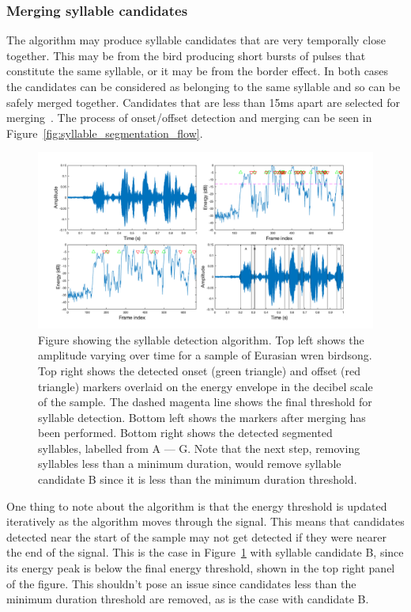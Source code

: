 \subsubsection{Merging syllable candidates}

The algorithm may produce syllable candidates that are very temporally close
together. This may be from the bird producing short bursts of pulses that
constitute the same syllable, or it may be from the border effect. In both cases
the candidates can be considered as belonging to the same syllable and so can be
safely merged together. Candidates that are less than 15ms apart are selected
for merging~\cite{fagerlund2004automatic}. The process of onset/offset detection
and merging can be seen in Figure~\ref{fig:syllable_segmentation_flow}.

\begin{figure}[ht]
  \centering
  \includegraphics[width=\textwidth]{figures/syllable_segmentation_2.png}
  \caption{Figure showing the syllable detection algorithm. Top left shows the
    amplitude varying over time for a sample of Eurasian wren birdsong. Top
    right shows the detected onset (green triangle) and offset (red triangle)
    markers overlaid on the energy envelope in the decibel scale of the sample.
    The dashed magenta line shows the final threshold for syllable detection.
    Bottom left shows the markers after merging has been performed. Bottom right
    shows the detected segmented syllables, labelled from A --- G. Note that the
    next step, removing syllables less than a minimum duration, would remove
    syllable candidate B since it is less than the minimum duration
threshold.}\label{fig:syllable_segmentation}
\end{figure}

One thing to note about the algorithm is that the energy threshold is updated
iteratively as the algorithm moves through the signal. This means that
candidates detected near the start of the sample may not get detected if they
were nearer the end of the signal. This is the case in
Figure~\ref{fig:syllable_segmentation} with syllable candidate B, since its
energy peak is below the final energy threshold, shown in the top right panel of
the figure. This shouldn't pose an issue since candidates less than the minimum
duration threshold are removed, as is the case with candidate B.

